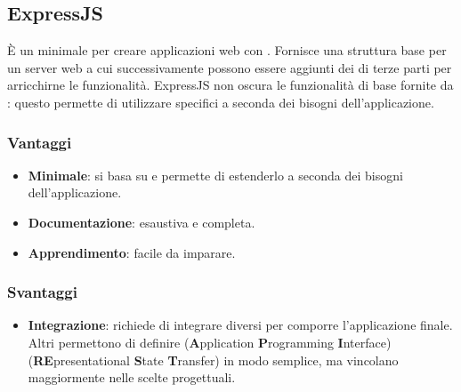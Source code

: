\subsection{ExpressJS}
È un  minimale per creare applicazioni web con . Fornisce una struttura base per un server web a cui successivamente possono essere aggiunti dei  di terze parti per arricchirne le funzionalità. ExpressJS non oscura le funzionalità di base fornite da : questo permette di utilizzare  specifici a seconda dei bisogni dell'applicazione.
\subsubsection{Vantaggi}
\begin{itemize}
\item \textbf{Minimale}: si basa su  e permette di estenderlo a seconda dei bisogni dell'applicazione.
\item \textbf{Documentazione}: esaustiva e completa.
\item \textbf{Apprendimento}: facile da imparare.
\end{itemize}
\subsubsection{Svantaggi}
\begin{itemize} 
\item \textbf{Integrazione}: richiede di integrare  diversi per comporre l'applicazione finale. Altri  permettono di definire  (\textbf{A}pplication \textbf{P}rogramming \textbf{I}nterface)  (\textbf{RE}presentational \textbf{S}tate \textbf{T}ransfer) in modo semplice, ma vincolano maggiormente nelle scelte progettuali.
\end{itemize}

